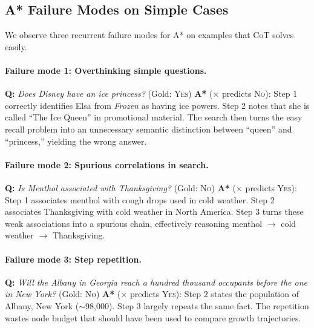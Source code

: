 \documentclass{article}
\begin{document}
\subsection{A* Failure Modes on Simple Cases}
\label{app:astar_failures}

We observe three recurrent failure modes for A* on examples that CoT solves easily.

\paragraph{Failure mode 1: Overthinking simple questions.}

\begin{examplebox}[title=StrategyQA --- Overthinking]
\textbf{Q:} \emph{Does Disney have an ice princess?} \quad (Gold: \textsc{Yes})
\tcblower
\textbf{A*} ($\times$ predicts \textsc{No}): Step 1 correctly identifies Elsa from \emph{Frozen} as having ice powers. Step 2 notes that she is called ``The Ice Queen'' in promotional material. The search then turns the easy recall problem into an unnecessary semantic distinction between ``queen'' and ``princess,'' yielding the wrong answer.
\end{examplebox}

\paragraph{Failure mode 2: Spurious correlations in search.}

\begin{examplebox}[title=StrategyQA --- Spurious Correlation]
\textbf{Q:} \emph{Is Menthol associated with Thanksgiving?} \quad (Gold: \textsc{No})
\tcblower
\textbf{A*} ($\times$ predicts \textsc{Yes}): Step 1 associates menthol with cough drops used in cold weather. Step 2 associates Thanksgiving with cold weather in North America. Step 3 turns these weak associations into a spurious chain, effectively reasoning menthol $\rightarrow$ cold weather $\rightarrow$ Thanksgiving.
\end{examplebox}

\paragraph{Failure mode 3: Step repetition.}

\begin{examplebox}[title=StrategyQA --- Step Repetition]
\textbf{Q:} \emph{Will the Albany in Georgia reach a hundred thousand occupants before the one in New York?} \quad (Gold: \textsc{No})
\tcblower
\textbf{A*} ($\times$ predicts \textsc{Yes}): Step 2 states the population of Albany, New York ($\sim$98{,}000). Step 3 largely repeats the same fact. The repetition wastes node budget that should have been used to compare growth trajectories.
\end{examplebox}
\end{document}
